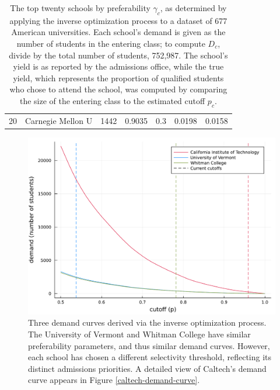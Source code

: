 \documentclass[12pt]{article}
\numberwithin{equation}{subsection}
\theoremstyle{definition}
\begin{document}
\begin{table}[]
\begin{tabular}{r|l|r|l|l|l|l}
20                                 & Carnegie Mellon U                     & 1442                                 & 0.9035                  & 0.3            & 0.0198              & 0.0158                             
\end{tabular}
\caption{\label{tab:US-inverse-optimization}
The top twenty schools by preferability $\gamma_c$, as determined by applying the inverse optimization process to a dataset of 677 American universities. Each school's demand is given as the number of students in the entering class; to compute $D_c$, divide by the total number of students, 752,987. The school's yield is as reported by the admissions office, while the true yield, which represents the proportion of qualified students who chose to attend the school, was computed by comparing the size of the entering class to the estimated cutoff $p_c$.}
\end{table}





\begin{figure}
\begin{center}\includegraphics[width=\linewidth, ]{plots/three-demand-curves.pdf}\end{center}
\captionsetup{singlelinecheck=off}
    \caption[.]{Three demand curves derived via the inverse optimization process. The University of Vermont and Whitman College have similar preferability parameters, and thus similar demand curves. However, each school has chosen a different selectivity threshold, reflecting its distinct admissions priorities. A detailed view of Caltech's demand curve appears in Figure \ref{caltech-demand-curve}.}
\label{three-demand-curves}
\end{figure}
\end{document}
